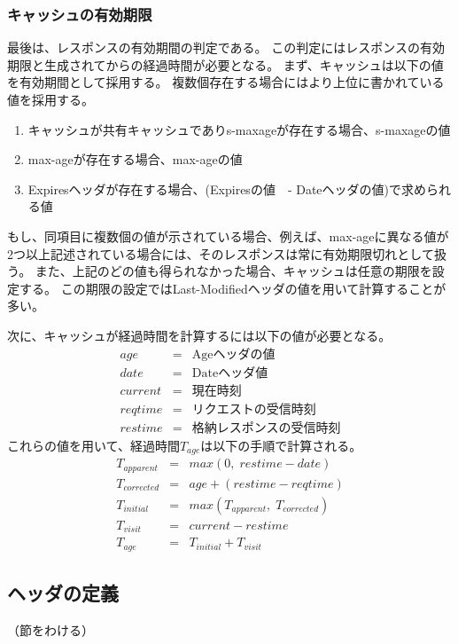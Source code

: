 \documentclass{css}
\begin{document}
\subsubsection{キャッシュの有効期限}
\label{sec:expiration}
最後は、レスポンスの有効期間の判定である。
この判定にはレスポンスの有効期限と生成されてからの経過時間が必要となる。
まず、キャッシュは以下の値を有効期間として採用する。
複数個存在する場合にはより上位に書かれている値を採用する。
\begin{enumerate}
\item キャッシュが共有キャッシュでありs-maxageが存在する場合、s-maxageの値
\item max-ageが存在する場合、max-ageの値
\item Expiresヘッダが存在する場合、(Expiresの値　- Dateヘッダの値)で求められる値
\end{enumerate}
もし、同項目に複数個の値が示されている場合、例えば、max-ageに異なる値が2つ以上記述されている場合には、そのレスポンスは常に有効期限切れとして扱う。
また、上記のどの値も得られなかった場合、キャッシュは任意の期限を設定する。
この期限の設定ではLast-Modifiedヘッダの値を用いて計算することが多い。

次に、キャッシュが経過時間を計算するには以下の値が必要となる。
\begin{eqnarray*}
age & = & \mbox{Ageヘッダの値}\\
date & = & \mbox{Dateヘッダ値}\\
current & = & \mbox{現在時刻}\\
reqtime & = & \mbox{リクエストの受信時刻}\\
restime & = & \mbox{格納レスポンスの受信時刻}
\end{eqnarray*}
これらの値を用いて、経過時間$T_{age}$は以下の手順で計算される。
\begin{eqnarray*}
T_{apparent} & = & max(0,\;restime - date)\\
T_{corrected} & = & age + (restime - reqtime)\\
T_{initial} & = & max(T_{apparent},\;T_{corrected})\\
T_{visit} & = & current - restime\\
T_{age} & = & T_{initial} + T_{visit}
\end{eqnarray*}

\subsection{ヘッダの定義}

\color{red}
（節をわける）
\color{black}
\end{document}
